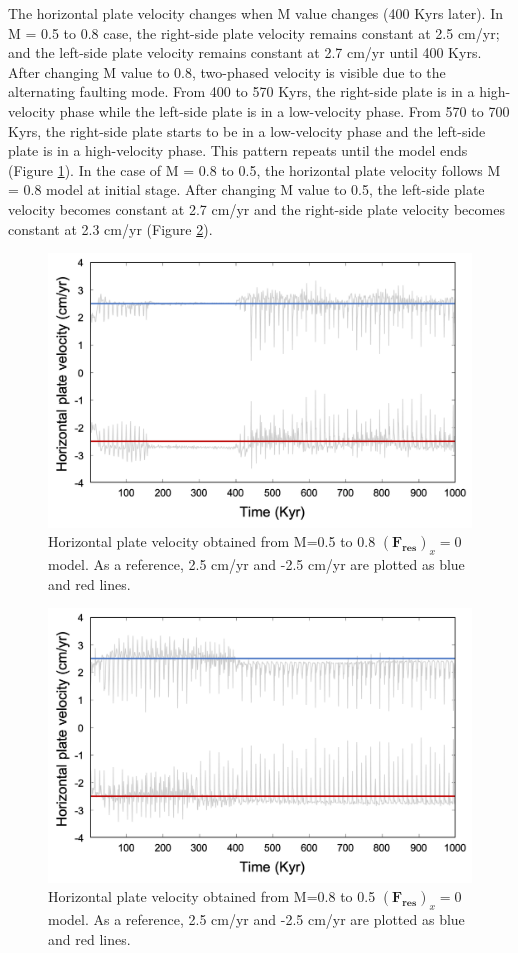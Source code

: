 \documentclass[letterpaper,12pt,notitle]{memphisthesis}                     %
\begin{document}
The horizontal plate velocity changes when M value changes (400 Kyrs later). In M = 0.5 to 0.8 case, the right-side plate velocity remains constant at 2.5 cm/yr; and the left-side plate velocity remains constant at 2.7 cm/yr until 400 Kyrs. After changing M value to 0.8, two-phased velocity is visible due to the alternating faulting mode. From 400 to 570 Kyrs, the right-side plate is in a high-velocity phase while the left-side plate is in a low-velocity phase. From 570 to 700 Kyrs, the right-side plate starts to be in a low-velocity phase and the left-side plate is in a high-velocity phase. This pattern repeats until the model ends (Figure \ref{fig:f005to08}). In the case of M = 0.8 to 0.5, the horizontal plate velocity follows M = 0.8 model at initial stage. After changing M value to 0.5, the left-side plate velocity becomes constant at 2.7 cm/yr and the right-side plate velocity becomes constant at 2.3 cm/yr (Figure \ref{fig:f008to05}).

\begin{figure}[!htb]
	\centering
	\includegraphics[width=0.9\linewidth]{./figs/f0m05to08.png}
	\caption{Horizontal plate velocity obtained from M=0.5 to 0.8 $(\boldsymbol{F_{res}})_x=0$ model. As a reference, 2.5 cm/yr and -2.5 cm/yr are plotted as blue and red lines.}
	\label{fig:f005to08}
\end{figure}
\begin{figure}[!htb]
	\centering
	\includegraphics[width=0.9\linewidth]{./figs/f0m08to05.png}
	\caption{Horizontal plate velocity obtained from M=0.8 to 0.5 $(\boldsymbol{F_{res}})_x=0$ model. As a reference, 2.5 cm/yr and -2.5 cm/yr are plotted as blue and red lines.}
	\label{fig:f008to05}
\end{figure}
\end{document}
